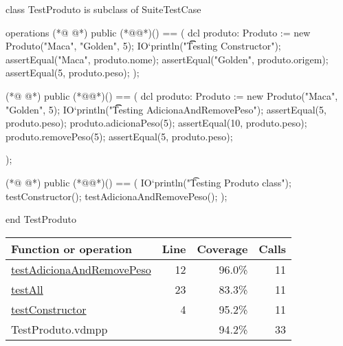 \begin{vdmpp}[breaklines=true]
class TestProduto is subclass of SuiteTestCase

operations
(*@
\label{testConstructor:4}
@*)
  public (*@@*)() == (
   dcl produto: Produto := new Produto("Maca", "Golden", 5);
    IO`println("\t\t Testing Constructor");
    assertEqual("Maca", produto.nome);
    assertEqual("Golden", produto.origem);
    assertEqual(5, produto.peso);
  );
  
(*@
\label{testAdicionaAndRemovePeso:12}
@*)
  public (*@@*)() == (
   dcl produto: Produto := new Produto("Maca", "Golden", 5);
  IO`println("\t\t Testing AdicionaAndRemovePeso");
  assertEqual(5, produto.peso);
  produto.adicionaPeso(5);
  assertEqual(10, produto.peso);
  produto.removePeso(5);
  assertEqual(5, produto.peso);
  
  );

(*@
\label{testAll:23}
@*)
  public (*@@*)() == (
    IO`println("\t Testing Produto class");
    testConstructor();
    testAdicionaAndRemovePeso();
  );

end TestProduto
\end{vdmpp}
\bigskip
\begin{longtable}{|l|r|r|r|}
\hline
Function or operation & Line & Coverage & Calls \\
\hline
\hline
\hyperref[testAdicionaAndRemovePeso:12]{testAdicionaAndRemovePeso} & 12&96.0\% & 11 \\
\hline
\hyperref[testAll:23]{testAll} & 23&83.3\% & 11 \\
\hline
\hyperref[testConstructor:4]{testConstructor} & 4&95.2\% & 11 \\
\hline
\hline
TestProduto.vdmpp & & 94.2\% & 33 \\
\hline
\end{longtable}


